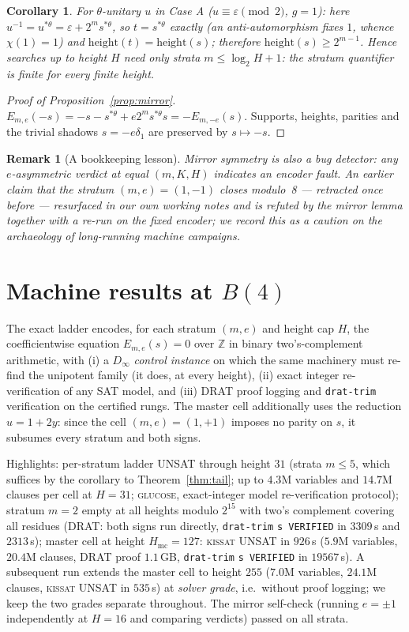 \documentclass[10pt,a4paper]{amsart}
\newtheorem{corollary}[theorem]{Corollary}
\newtheorem{remark}[theorem]{Remark}
\newcommand{\ZZ}{\mathbb{Z}}
\newcommand{\thst}{{*\theta}}
\newcommand{\hgt}{\mathrm{height}}
\begin{document}
\begin{corollary}
For $\theta$-unitary $u$ in Case A ($u\equiv\varepsilon\pmod 2$,
$g=1$): here $u^{-1}=u^{\thst}=\varepsilon+2^m s^{\thst}$, so $t=
s^{\thst}$ exactly (an anti-automorphism fixes $1$, whence
$\chi(1)=1$) and $\hgt(t)=\hgt(s)$; therefore $\hgt(s)\ge 2^{m-1}$.
Hence searches up to height $H$ need only strata $m\le \log_2 H+1$:
the stratum quantifier is finite for every finite height.
\end{corollary}

\begin{proof}[Proof of Proposition~\ref{prop:mirror}]
$E_{m,e}(-s)=-s-s^{\thst}+e2^m s^{\thst}s=-E_{m,-e}(s)$.  Supports,
heights, parities and the trivial shadows $s=-e\delta_1$ are
preserved by $s\mapsto-s$.
\end{proof}

\begin{remark}[A bookkeeping lesson]
Mirror symmetry is also a bug detector: any $e$-asymmetric verdict at
equal $(m,K,H)$ indicates an encoder fault.  An earlier claim that the
stratum $(m,e)=(1,-1)$ closes modulo~8 --- retracted once before ---
resurfaced in our own working notes and is refuted by the mirror
lemma together with a re-run on the fixed encoder; we record this as
a caution on the archaeology of long-running machine campaigns.
\end{remark}

\section{Machine results at $B(4)$}\label{sec:machine}

The exact ladder encodes, for each stratum $(m,e)$ and height cap
$H$, the coefficientwise equation $E_{m,e}(s)=0$ over $\ZZ$ in binary
two's-complement arithmetic, with (i) a $D_\infty$ \emph{control
instance} on which the same machinery must re-find the unipotent
family (it does, at every height), (ii) exact integer re-verification
of any SAT model, and (iii) DRAT proof logging and \texttt{drat-trim}
verification on the certified rungs.  The master cell additionally
uses the reduction $u=1+2y$: since the cell $(m,e)=(1,+1)$ imposes no
parity on $s$, it subsumes every stratum and both signs.

Highlights: per-stratum ladder UNSAT through height $31$ (strata
$m\le 5$, which suffices by the corollary to Theorem~\ref{thm:tail};
up to $4.3$M variables and $14.7$M clauses per cell at $H=31$;
\textsc{glucose}, exact-integer model re-verification protocol);
stratum $m=2$ empty at all heights modulo $2^{15}$ with two's
complement covering all residues (DRAT: both signs run directly,
\texttt{drat-trim} \texttt{s VERIFIED} in $3309$\,s and $2313$\,s);
master cell at height $H_{\mathrm{mc}}=127$: \textsc{kissat} UNSAT in
$926$\,s ($5.9$M variables, $20.4$M clauses, DRAT proof $1.1$\,GB,
\texttt{drat-trim} \texttt{s VERIFIED} in $19567$\,s).  A subsequent
run extends the master cell to height $255$ ($7.0$M variables,
$24.1$M clauses, \textsc{kissat} UNSAT in $535$\,s) at \emph{solver
grade}, i.e.\ without proof logging; we keep the two grades separate
throughout.  The mirror self-check (running $e=\pm1$ independently at
$H=16$ and comparing verdicts) passed on all strata.
\end{document}
